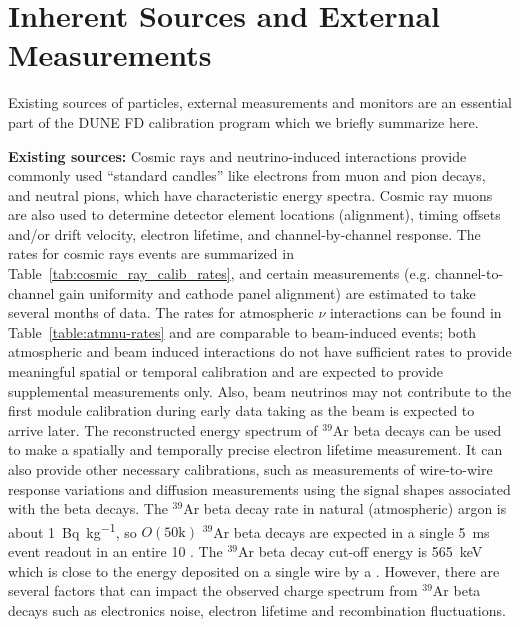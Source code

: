 
\section{Inherent Sources and External Measurements}
\label{sec:exis}

Existing sources of particles, external measurements and monitors are an essential part of the DUNE FD calibration program which we briefly summarize here. 

\textbf{Existing sources:} Cosmic rays and neutrino-induced interactions provide commonly used ``standard candles'' like electrons from muon and pion decays, and neutral pions, which have characteristic energy spectra. Cosmic ray muons are also used to determine detector element locations (alignment), timing offsets and/or drift velocity, electron lifetime, and channel-by-channel response. The rates for cosmic rays events are summarized in Table~\ref{tab:cosmic_ray_calib_rates}, and certain measurements (e.g. channel-to-channel gain uniformity and cathode panel alignment) are estimated to take several months of data. The rates for atmospheric $\nu$ interactions can be found in Table~\ref{table:atmnu-rates} and are comparable to beam-induced events; both atmospheric and beam induced interactions do not have sufficient rates to provide meaningful spatial or temporal calibration and are expected to provide supplemental measurements only. Also, beam neutrinos may not contribute to the first module calibration during early data taking as the beam is expected to arrive later. The reconstructed energy spectrum of ${}^{39}$Ar beta decays can be used to make a spatially and temporally precise electron lifetime measurement. It can also provide other necessary calibrations, such as measurements of wire-to-wire response variations and diffusion measurements using the signal shapes associated with the beta decays.
The ${}^{39}$Ar beta decay rate in natural (atmospheric) argon is about \SI{1}{\becquerel\per\kilo\gram}, so $O(\mathrm{50k})$ ${}^{39}$Ar beta decays are expected in a single \SI{5}{\milli\s} event readout in an entire \SI{10}{\kt} \detmodule. The ${}^{39}$Ar beta decay cut-off energy is \SI{565}{\keV} which is close to the energy deposited on a single wire by a . However, there are several factors that can impact the observed charge spectrum from ${}^{39}$Ar beta decays such as electronics noise, electron lifetime and recombination fluctuations.%

